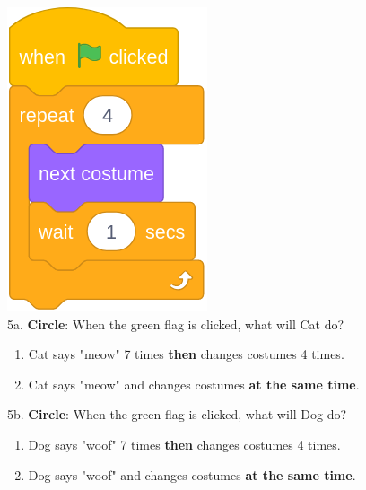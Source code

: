 \documentclass[letterpaper,12pt]{article}
\begin{document}
\includegraphics[scale=.3, valign=t]{q5_script2.png} \\ 

\noindent 5a. \textbf{Circle}: When the green flag is clicked, what will Cat do?
\renewcommand{\theenumi}{\Alph{enumi}}
\begin{enumerate}
\item Cat says "meow" 7 times \textbf{then} changes costumes 4 times.
\item Cat says "meow" and changes costumes \textbf{at the same time}. \\
\end{enumerate}

\noindent 5b. \textbf{Circle}: When the green flag is clicked, what will Dog do?
\renewcommand{\theenumi}{\Alph{enumi}}
\begin{enumerate}
\item Dog says "woof" 7 times \textbf{then} changes costumes 4 times.
\item Dog says "woof" and changes costumes \textbf{at the same time}. \\
\end{enumerate}

\newpage
\end{document}
